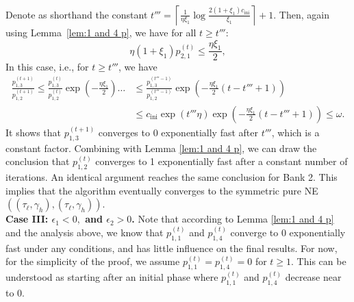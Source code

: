 Denote as shorthand the constant $t'''=\left\lceil\frac{1}{\eta\xi_1}\log\frac{2(1+\xi_1)c_{\text{ini}}}{\xi_1}\right\rceil+1$.
Then, again using Lemma~\ref{lem:1 and 4 p}, we have for all $t \geq t'''$:
$$ \eta(1+\xi_1)p_{2,1}^{(t)}\leq \frac{\eta\xi_1}{2}, $$
In this case, i.e., for $t\geq t'''$, we have 
\begin{align*}
    \frac{p^{(t+1)}_{1,3}}{p^{(t+1)}_{1,2}} \leq \frac{p^{(t)}_{1,3}}{p^{(t)}_{1,2}} \exp\left(-\frac{\eta\xi_1}{2}\right) \ldots &\leq \frac{p^{(t'''-1)}_{1,3}}{p^{(t'''-1)}_{1,2}} \exp\left(-\frac{\eta\xi_1}{2}(t-t'''+1)\right)
    \\& \leq c_{\text{ini}}\exp(t'''\eta)\exp\left(-\frac{\eta\xi_1}{2}(t-t'''+1)\right)\leq \omega. 
\end{align*}
It shows that $p_{1,3}^{(t+1)}$ converges to 0 exponentially fast after $t'''$, which is a constant factor. Combining with Lemma \ref{lem:1 and 4 p}, we can draw the conclusion that $p_{1,2}^{(t)}$ converges to 1 exponentially fast after a constant number of iterations. 
An identical argument reaches the same conclusion for Bank 2.
This implies that the algorithm eventually converges to the symmetric pure NE $((\tau_{\ell},\gamma_h),(\tau_{\ell},\gamma_h))$.\\

\noindent \textbf{Case III: $\epsilon_1<0,$ and $\epsilon_2>0$.}
Note that according to Lemma \ref{lem:1 and 4 p} and the analysis above, we know that $p^{(t)}_{1,1}$ and $p^{(t)}_{1,4}$ converge to 0 exponentially fast under any conditions, and has little influence on the final results. For now, for the simplicity of the proof, we assume $p^{(t)}_{1,1}=p^{(t)}_{1,4}=0$ for $t\geq1$. This can be understood as starting after an initial phase where $p^{(t)}_{1,1}$ and $p^{(t)}_{1,4}$ decrease near to 0. 
\\



